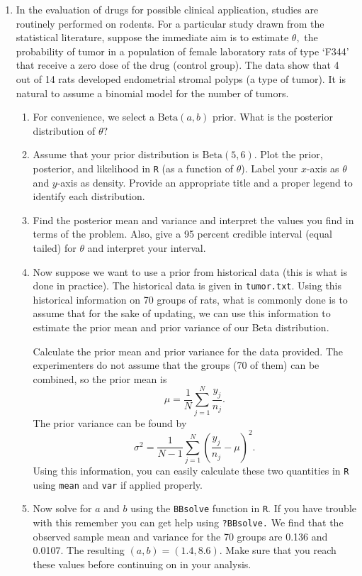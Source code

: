 \documentclass[12pt]{article}
\newcommand{\tth}{\theta}
\begin{document}
\begin{enumerate} 
\item In the evaluation of drugs for possible clinical application, studies are routinely performed on rodents. For a particular study drawn from the statistical literature, suppose the immediate aim is to estimate $\theta,$ the probability of tumor in a population of female laboratory rats of type `F344' that receive a zero dose of the drug (control group). The data show that 4 out of 14 rats developed endometrial stromal polyps (a type of tumor). It is natural to assume a binomial model for the number of tumors.
\begin{enumerate}
\item For convenience, we select a $\text{Beta}(a,b)$ prior. What is the posterior distribution of $\tth?$ 
\item Assume that your prior distribution is $\text{Beta}(5,6).$ Plot the prior, posterior, and likelihood in \texttt{R} (as a function of $\theta$). Label your \mbox{$x$-axis} as $\theta$ and $y$-axis as density. Provide an appropriate title and a proper legend to identify each distribution. 
\item Find the posterior mean and variance and interpret the values you find in terms of the problem. Also, give a 95 percent credible interval (equal tailed) for $\theta$ and interpret your interval.
\item Now suppose we want to use a prior from historical data (this is what is done in practice). The historical data is given in \texttt{tumor.txt}. Using this historical information on 70 groups of rats, what is commonly done is to assume that for the sake of updating, we can use this information to estimate the prior mean and prior variance of our Beta distribution. 

Calculate the prior mean and prior variance for the data provided. The experimenters do not assume that the groups (70 of them) can be combined, so the prior mean is $$\mu = \frac{1}{N}\sum_{j=1}^N\frac{y_j}{n_j}.$$ The prior variance can be found by
$$\sigma^2 = \frac{1}{N-1}\sum_{j=1}^N\left(\frac{y_j}{n_j}-\mu\right)^2.$$ Using this information, you can easily calculate these two quantities in \texttt{R} using \texttt{mean} and \texttt{var} if applied properly.


\item Now solve for $a$ and $b$ using the \texttt{BBsolve} function in \texttt{R}. If you have trouble with this remember you can get help using \texttt{?BBsolve.} We find that the observed sample mean and variance for the 70 groups are 0.136 and 0.0107. The resulting $(a,b) = (1.4,8.6).$ Make sure that you reach these values before continuing on in your analysis.


\end{enumerate}
\end{enumerate}
\end{document}
